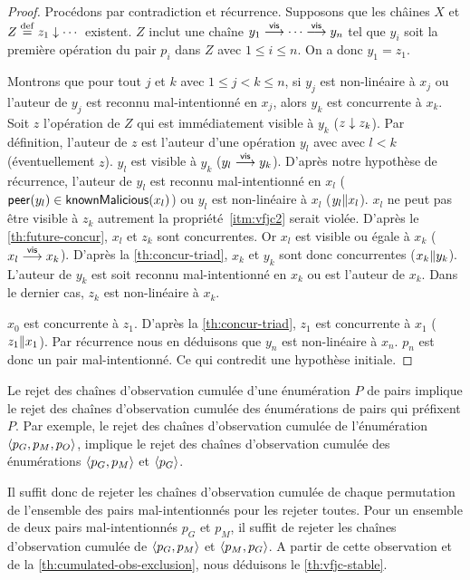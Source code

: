 \begin{proof}
Procédons par contradiction et récurrence.
Supposons que les châines $X$ et $Z \defeq z_1 \idr \dotsb$ existent.
$Z$ inclut une chaîne $y_1 \vis \dotsb \vis y_n$ tel que $y_i$ soit la première opération du pair $p_i$ dans $Z$ avec $1 \leq i \leq n$.
On a donc $y_1 = z_1$.

Montrons que pour tout $j$ et $k$ avec $1 \leq j < k \leq n$, si $y_j$ est non-linéaire à $x_j$ ou l'auteur de $y_j$ est reconnu mal-intentionné en $x_j$, alors $y_k$ est concurrente à $x_k$.
Soit $z$ l'opération de $Z$ qui est immédiatement visible à $y_k$ ($z \idr z_k$).
Par définition, l'auteur de $z$ est l'auteur d'une opération $y_l$ avec avec $l < k$ (éventuellement $z$).
$y_l$ est visible à $y_k$ ($y_l \vis y_k$).
D'après notre hypothèse de récurrence, l'auteur de $y_l$ est reconnu mal-intentionné en $x_l$ ($\trm{peer}(y_l) \in \trm{knownMalicious}(x_l)$) ou $y_l$ est non-linéaire à $x_l$ ($y_l \concur x_l$).
$x_l$ ne peut pas être visible à $z_k$ autrement la propriété~\ref{itm:vfjc2} serait violée.
D'après le \autoref{th:future-concur}, $x_l$ et $z_k$ sont concurrentes.
Or $x_l$ est visible ou égale à $x_k$ ($x_l \vis x_k$).
D'après la \autoref{th:concur-triad}, $x_k$ et $y_k$ sont donc concurrentes ($x_k \concur y_k$).
L'auteur de $y_k$ est soit reconnu mal-intentionné en $x_k$ ou est l'auteur de $x_k$.
Dans le dernier cas, $z_k$ est non-linéaire à $x_k$.

$x_0$ est concurrente à $z_1$.
D'après la \autoref{th:concur-triad}, $z_1$ est concurrente à $x_1$ ($z_1 \concur x_1$).
Par récurrence nous en déduisons que $y_n$ est non-linéaire à $x_n$.
$p_n$ est donc un pair mal-intentionné.
Ce qui contredit une hypothèse initiale.
\end{proof}

Le rejet des chaînes d'observation cumulée d'une énumération $P$ de pairs implique le rejet des chaînes d'observation cumulée des énumérations de pairs qui préfixent $P$.
Par exemple, le rejet des chaînes d'observation cumulée de l'énumération $\tuple*{p_G, p_M, p_O}$, implique le rejet des chaînes d'observation cumulée des énumérations $\tuple*{p_G, p_M}$ et $\tuple*{p_G}$.

Il suffit donc de rejeter les chaînes d'observation cumulée de chaque permutation de l'ensemble des pairs mal-intentionnés pour les rejeter toutes.
Pour un ensemble de deux pairs mal-intentionnés $p_G$ et $p_M$, il suffit de rejeter les chaînes d'observation cumulée de $\tuple*{p_G, p_M}$ et $\tuple*{p_M, p_G}$.
A partir de cette observation et de la \autoref{th:cumulated-obs-exclusion}, nous déduisons le \autoref{th:vfjc-stable}.

